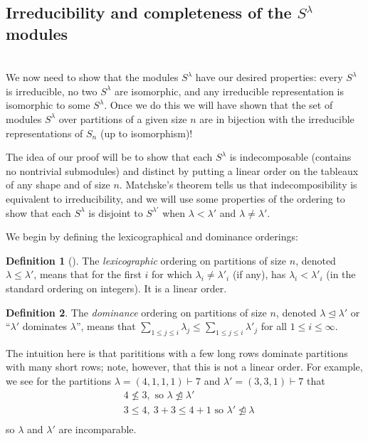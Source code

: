 \documentclass[12pt,twoside]{reedthesis}
\theoremstyle{plain}   %
\theoremstyle{definition}
\newtheorem{defn}{Definition}[section]
\theoremstyle{remark}
\numberwithin{equation}{section}
\def\normeq{\trianglelefteq}
\begin{document}
  \subsection{Irreducibility and completeness of the $S^\lambda$ modules} \hfill\\
  We now need to show that the modules $S^\lambda$ have our desired properties: every $S^\lambda$ is irreducible, no two $S^\lambda$ are isomorphic,
  and any irreducible representation is isomorphic to some $S^\lambda$. Once we do this we will have shown that the set of modules $S^\lambda$
  over partitions of a given size $n$
  are in bijection with the irreducible representations of $S_n$ (up to isomorphism)! \par
  The idea of our proof will be to show that each $S^\lambda$ is indecomposable (contains no nontrivial submodules)
  and distinct by putting a linear order on the tableaux of any shape
  and of size $n$. Matchske's theorem tells us that indecomposibility is equivalent to irreducibility, and we will use some properties of the ordering
  to show that each $S^\lambda$ is disjoint to $S^{\lambda'}$ when $\lambda < \lambda'$ and $\lambda \neq \lambda'$.
  \par
  We begin by defining the lexicographical and dominance orderings:
  \begin{defn}[{\cite[pg. 36]{fulton}}]
    The \emph{lexicographic} ordering on partitions of size $n$, denoted $ \lambda \leq \lambda'$, means that
    for the first $i$ for which $\lambda_i \neq \lambda'_i$ (if any), has $\lambda_i < \lambda'_i$ (in the standard ordering on integers).
    It is a linear order.
  \end{defn}
  \begin{defn}
    The \emph{dominance} ordering on partitions of size $n$, denoted $ \lambda \normeq \lambda'$ or ``$\lambda'$ dominates $\lambda$'',
    means that $\sum_{1 \leq j \leq i} \lambda_j \leq \sum_{1 \leq j \leq i} \lambda'_j$ for all $ 1 \leq i \leq \infty$. \par
    The intuition here is that parititions with a few long rows dominate partitions with many short rows; note, however, that this is
    not a linear order. For example, we see for the partitions $\lambda = (4,1,1,1) \vdash 7$ and $\lambda' = (3,3,1) \vdash 7$ that
    \begin{align*}
      &4 \not \leq 3, \text{ so $\lambda \not \normeq \lambda'$}\\
      &3 \leq  4, \ 3 + 3 \leq 4 + 1  \text{ so $\lambda' \not \normeq \lambda$}\\
    \end{align*}
    so $\lambda$ and $\lambda'$ are incomparable.
  \end{defn}
\end{document}
